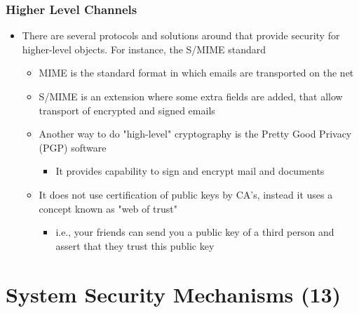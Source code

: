 \documentclass[11pt]{article}
\begin{document}
\subsubsection{Higher Level Channels}
\label{sec:org7415185}
\begin{itemize}
\item There are several protocols and solutions around that provide security for higher-level objects. For instance, the S/MIME standard
\begin{itemize}
\item MIME is the standard format in which emails are transported on the net
\item S/MIME is an extension where some extra fields are added, that allow transport of encrypted and signed emails
\item Another way to do "high-level" cryptography is the Pretty Good Privacy (PGP) software
\begin{itemize}
\item It provides capability to sign and encrypt mail and documents
\end{itemize}
\item It does not use certification of public keys by CA’s, instead it uses a concept known as "web of trust"
\begin{itemize}
\item i.e., your friends can send you a public key of a third person and assert that they trust this public key
\end{itemize}
\end{itemize}
\end{itemize}

\section{System Security Mechanisms (13)}
\label{sec:org20959d8}
\end{document}
